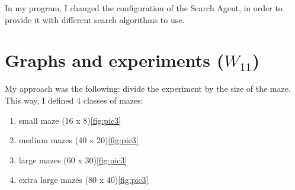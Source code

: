 \documentclass[a4paper,12pt]{report}
\begin{document}
In my program, I changed the configuration of the Search Agent, in order to provide it with different search algorithms to use.


\chapter{Graphs and experiments ($W_{11}$)}

My approach was the following: divide the experiment by the size of the maze. This way, I defined 4 classes of mazes:

\begin{enumerate}
\item small maze (16 x 8)\ref{fig:pic3}
\item medium mazes (40 x 20)\ref{fig:pic3}
\item large mazes (60 x 30)\ref{fig:pic3}
\item extra large mazes (80 x 40)\ref{fig:pic3}
\end{enumerate}
\end{document}
